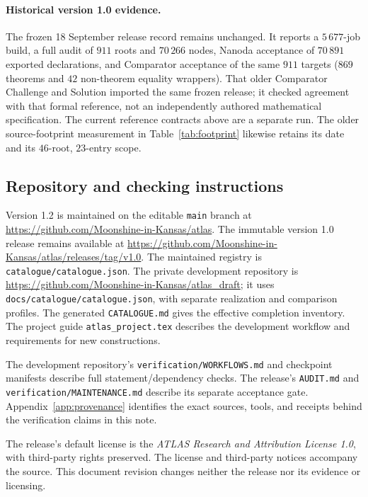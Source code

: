 \documentclass[11pt]{article}
\numberwithin{equation}{section}
\theoremstyle{definition}
\newcommand{\code}[1]{\texttt{\small #1}}
\newcommand{\leanname}[1]{{\small\nolinkurl{#1}}}
\begin{document}
\paragraph{Historical version 1.0 evidence.}
The frozen 18 September release record remains unchanged. It reports
a $5\,677$-job build, a full audit of $911$ roots and $70\,266$ nodes,
Nanoda acceptance of $70\,891$ exported declarations, and Comparator
acceptance of the same $911$ targets ($869$ theorems and $42$
non-theorem equality wrappers). That older Comparator Challenge and
Solution imported the same frozen release; it checked agreement with
that formal reference, not an independently authored mathematical
specification. The current reference contracts above are a separate run.
The older source-footprint measurement in Table~\ref{tab:footprint}
likewise retains its date and its $46$-root, $23$-entry scope.


\subsection{Repository and checking instructions}\label{sec:release}

Version 1.2 is maintained on the editable \code{main} branch at
\url{https://github.com/Moonshine-in-Kansas/atlas}. The immutable version 1.0
release remains available at
\url{https://github.com/Moonshine-in-Kansas/atlas/releases/tag/v1.0}.
The maintained registry
is \leanname{catalogue/catalogue.json}. The private development repository
is \url{https://github.com/Moonshine-in-Kansas/atlas_draft}; it uses
\leanname{docs/catalogue/catalogue.json}, with separate realization and
comparison profiles. The generated \code{CATALOGUE.md} gives the effective
completion inventory. The project guide \leanname{atlas_project.tex}
describes the development workflow and requirements for new constructions.

The development repository's \leanname{verification/WORKFLOWS.md} and checkpoint manifests
describe full statement/dependency checks. The release's \code{AUDIT.md}
and \leanname{verification/MAINTENANCE.md} describe its separate acceptance
gate. Appendix~\ref{app:provenance} identifies the exact sources, tools,
and receipts behind the verification claims in this note.

The release's default license is the \emph{ATLAS Research and Attribution
License 1.0}, with third-party rights preserved. The license and
third-party notices accompany the source. This document revision changes
neither the release nor its evidence or licensing.
\end{document}
